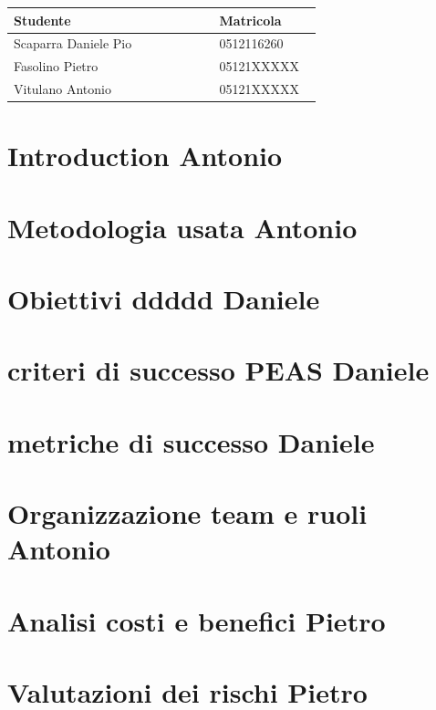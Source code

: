\documentclass{article}
\title{}
\author{} %
\date{} %
\begin{document}
\maketitle

\begin{center}
\begin{tabular}{|p{0.6\linewidth}|p{0.3\linewidth}|}
\hline
    \textbf{Studente} & \textbf{Matricola} \\
\hline
    Scaparra Daniele Pio & 0512116260 \\
\hline
    Fasolino Pietro & 05121XXXXX \\
\hline
    Vitulano Antonio & 05121XXXXX \\
\hline
\end{tabular}
\end{center}

\section{Introduction Antonio}\label{sec:introduction-antonio}

\section{Metodologia usata Antonio}\label{sec:metodologia-usata-antonio}

\section{Obiettivi ddddd Daniele}\label{sec:obiettivi-ddddd-daniele}

\section{criteri di successo PEAS Daniele}\label{sec:criteri-di-successo-peas-daniele}

\section{metriche di successo Daniele}\label{sec:metriche-di-successo-daniele}

\section{Organizzazione team e ruoli Antonio}\label{sec:organizzazione-team-e-ruoli-antonio}

\section{Analisi costi e benefici Pietro}\label{sec:analisi-costi-e-benefici-pietro}

\section{Valutazioni dei rischi Pietro}\label{sec:valutazioni-dei-rischi-pietro}
\end{document}

